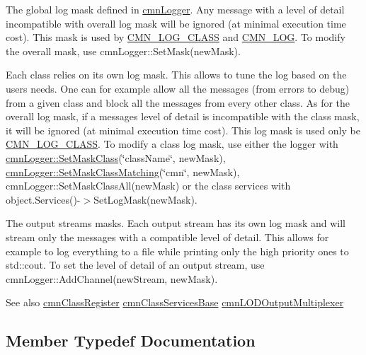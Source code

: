 \begin{DoxyItemize}
\item The global log mask defined in \hyperlink{classcmn_logger}{cmn\+Logger}. Any message with a level of detail incompatible with overall log mask will be ignored (at minimal execution time cost). This mask is used by \hyperlink{cmn_logger_8h_a3fa9ee12c1a4d138c2594449aaf23729}{C\+M\+N\+\_\+\+L\+O\+G\+\_\+\+C\+L\+A\+S\+S} and \hyperlink{cmn_logger_8h_a2eb3b40558ec17c9ae45197777aca7b2}{C\+M\+N\+\_\+\+L\+O\+G}. To modify the overall mask, use cmn\+Logger\+::\+Set\+Mask(new\+Mask).
\item Each class relies on its own log mask. This allows to tune the log based on the user\textquotesingle{}s needs. One can for example allow all the messages (from errors to debug) from a given class and block all the messages from every other class. As for the overall log mask, if a message\textquotesingle{}s level of detail is incompatible with the class mask, it will be ignored (at minimal execution time cost). This log mask is used only be \hyperlink{cmn_logger_8h_a3fa9ee12c1a4d138c2594449aaf23729}{C\+M\+N\+\_\+\+L\+O\+G\+\_\+\+C\+L\+A\+S\+S}. To modify a class log mask, use either the logger with \hyperlink{classcmn_logger_ac02d8a05e26687bf66951aab021adad7}{cmn\+Logger\+::\+Set\+Mask\+Class}(\char`\"{}class\+Name\char`\"{}, new\+Mask), \hyperlink{classcmn_logger_ae835d053611487f98a3d216ca8ca6f28}{cmn\+Logger\+::\+Set\+Mask\+Class\+Matching}(\char`\"{}cmn\char`\"{}, new\+Mask), cmn\+Logger\+::\+Set\+Mask\+Class\+All(new\+Mask) or the class services with object.\+Services()-\/$>$Set\+Log\+Mask(new\+Mask).
\item The output streams masks. Each output stream has its own log mask and will stream only the messages with a compatible level of detail. This allows for example to log everything to a file while printing only the high priority ones to std\+::cout. To set the level of detail of an output stream, use cmn\+Logger\+::\+Add\+Channel(new\+Stream, new\+Mask).
\end{DoxyItemize}

\begin{DoxySeeAlso}{See also}
\hyperlink{classcmn_class_register}{cmn\+Class\+Register} \hyperlink{classcmn_class_services_base}{cmn\+Class\+Services\+Base} \hyperlink{classcmn_l_o_d_output_multiplexer}{cmn\+L\+O\+D\+Output\+Multiplexer} 
\end{DoxySeeAlso}


\subsection{Member Typedef Documentation}
\hypertarget{classcmn_logger_a7d192777882d1dc6bb48ceac0b4e65bb}{}
